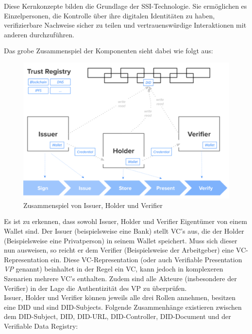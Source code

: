 \newpage
Diese Kernkonzepte bilden die Grundlage der SSI-Technologie. Sie ermöglichen es Einzelpersonen, die Kontrolle über ihre digitalen Identitäten zu haben, verifizierbare Nachweise sicher zu teilen und vertrauenswürdige Interaktionen mit anderen durchzuführen.


Das grobe Zusammenspiel der Komponenten sieht dabei wie folgt aus:

\begin{figure}[h]
	\centering
	\includegraphics[scale=0.3]{media/zusammenspiel.png}
	\caption{Zusammenspiel von Issuer, Holder und Verifier \cite{ID62}}
	\label{fig:meine-grafik}
\end{figure}

Es ist zu erkennen, dass sowohl Issuer, Holder und Verifier Eigentümer von einem Wallet sind. Der Issuer (beispielsweise eine Bank) stellt VC's aus, die der Holder (Beispielsweise eine Privatperson) in seinem Wallet speichert. Muss sich dieser nun ausweisen, so reicht er dem Verifier (Beispielsweise der Arbeitgeber) eine VC-Representation ein. Diese VC-Representation (oder auch Verifiable Presentation \textsl{VP} genannt) beinhaltet in der Regel ein VC, kann jedoch in komplexeren Szenarien mehrere VC's enthalten. Zudem sind alle Akteure (insbesondere der Verifier) in der Lage die Authentizität des VP zu überprüfen.\\

Issuer, Holder und Verifier können jeweils alle drei Rollen annehmen, besitzen eine DID und sind DID-Subjects. Folgende Zusammenhänge existieren zwischen dem DID-Subject, DID, DID-URL, DID-Controller, DID-Document und der Verifiable Data Registry:

